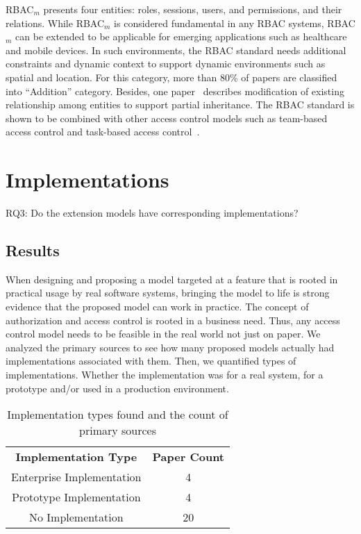 RBAC$_{m}$ presents four entities: roles, sessions, users, and permissions, and their relations. While RBAC$_{m}$ is considered fundamental in any RBAC systems, RBAC$_{m}$ can be extended to be applicable for emerging applications such as healthcare and mobile devices. 
In such environments, the RBAC standard needs additional constraints and dynamic context to support dynamic environments such as spatial and location. For this category, more than 80\% of papers are classified into ``Addition'' category. Besides, one paper~\cite{alam06:constraint} describes modification of existing relationship among entities to support partial inheritance. The RBAC standard is shown to be combined with other access control models such as team-based access control and task-based access control~\cite{zhou2007team, oh2003task}.





\section{Implementations} \label{sec:implementations}

RQ3: Do the extension models have corresponding implementations?

\subsection{Results}

When designing and proposing a model targeted at a feature that is rooted in practical
usage by real software systems, bringing the model to life is strong evidence that the
proposed model can work in practice. The concept of authorization and access control
is rooted in a business need. Thus, any access control model needs to be feasible
in the real world not just on paper. We analyzed the primary sources to see how many
proposed models actually had implementations associated with them.  Then, we quantified
types of implementations. Whether the implementation was for a real system, for a prototype
and/or used in a production environment.

\begin{table}
\centering
\caption{Implementation types found and the count of primary sources}
\begin{tabular}{ | c | c | }
\cline{1-2}

\textbf{Implementation Type} & \textbf{Paper Count} \\ \cline{1-2}
Enterprise Implementation & 4 \\ \cline{1-2}
Prototype Implementation & 4 \\ \cline{1-2}
No Implementation & 20 \\

\cline{1-2}
\end{tabular}
\label{tab:implementations}
\end{table}

